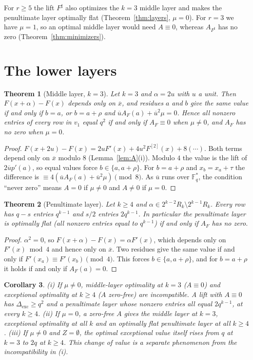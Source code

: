 \documentclass[11pt]{article}
\newtheorem{theorem}{Theorem}[section]
\newtheorem{corollary}[theorem]{Corollary}
\theoremstyle{definition}
\theoremstyle{remark}
\newcommand{\F}{\mathbb{F}}
\newcommand{\ol}[1]{\overline{#1}}
\newcommand{\Dexc}{\Delta_{\mathrm{exc}}}
\begin{document}
For $r\ge5$ the lift $F^\sharp$ also optimizes the $k=3$ middle layer and makes the penultimate layer optimally flat
(Theorem~\ref{thm:layers}, $\mu=0$). For $r=3$ we have $\mu=1$, so an optimal middle layer
would need $A\equiv0$, whereas $A_{F^\sharp}$ has no zero (Theorem~\ref{thm:minimizers}).

\section{The lower layers}\label{sec:layers}

\begin{theorem}[Middle layer, $k=3$]\label{thm:O3}
Let $k=3$ and $\alpha=2u$ with $u$ a unit. Then $F(x+\alpha)-F(x)$ depends only on $\ol x$, and residues $a$ and $b$ give the same value
if and only if $b=a$, or $b=a+\rho$ and $\ol u A_F(a)+\ol u^2\mu=0$. Hence all nonzero entries of every row in
$v_1$ equal $q^2$ if and only if $A_F\equiv0$ when $\mu\ne0$, and $A_F$ has no zero when $\mu=0$.
\end{theorem}
\begin{proof}
$F(x+2u)-F(x)=2uF'(x)+4u^2F^{[2]}(x)+8(\cdots)$. Both terms depend only on $\ol x$ modulo $8$
(Lemma~\ref{lem:A}(i)). Modulo $4$ the value is the lift of $2\ol up'(a)$, so equal values force
$b\in\{a,a+\rho\}$. For $b=a+\rho$ and $x_b=x_a+\tau$ the difference is $\equiv4(\ol uA_F(a)+\ol u^2\mu)\pmod 8$.
As $\ol u$ runs over $\F_q^*$, the condition ``never zero'' means $A=0$ if $\mu\ne0$ and $A\ne0$ if $\mu=0$.
\end{proof}

\begin{theorem}[Penultimate layer]\label{thm:M4}
Let $k\ge4$ and $\alpha\in2^{k-2}R_k\setminus2^{k-1}R_k$. Every row has $q-s$ entries $q^{k-1}$ and $s/2$ entries
$2q^{k-1}$. In particular the penultimate layer is optimally flat (all nonzero entries equal to $q^{k-1}$) if and
only if $A_F$ has no zero.
\end{theorem}
\begin{proof}
$\alpha^2=0$, so $F(x+\alpha)-F(x)=\alpha F'(x)$, which depends only on $F'(x)\bmod4$ and hence only on $\ol x$.
Two residues give the same value if and only if $F'(x_a)\equiv F'(x_b)\pmod4$. This forces $b\in\{a,a+\rho\}$,
and for $b=a+\rho$ it holds if and only if $A_F(a)=0$.
\end{proof}

\begin{corollary}\label{cor:M5}
(i) If $\mu\ne0$, middle-layer optimality at $k=3$ ($A\equiv0$) and exceptional optimality at $k\ge4$ ($A$
zero-free) are incompatible. A lift with $A\equiv0$ has $\Dexc\ge q^2$ and a penultimate layer whose nonzero entries
all equal $2q^{k-1}$, at every $k\ge4$.
(ii) If $\mu=0$, a zero-free $A$ gives the middle layer at $k=3$, exceptional optimality at all $k$ and an
optimally flat penultimate layer at all $k\ge4$.
(iii) If $\mu\ne0$ and $Z=\emptyset$, the optimal exceptional value itself rises from $q$ at $k=3$ to $2q$ at
$k\ge4$. This change of value is a separate phenomenon from the incompatibility in (i).
\end{corollary}
\end{document}
